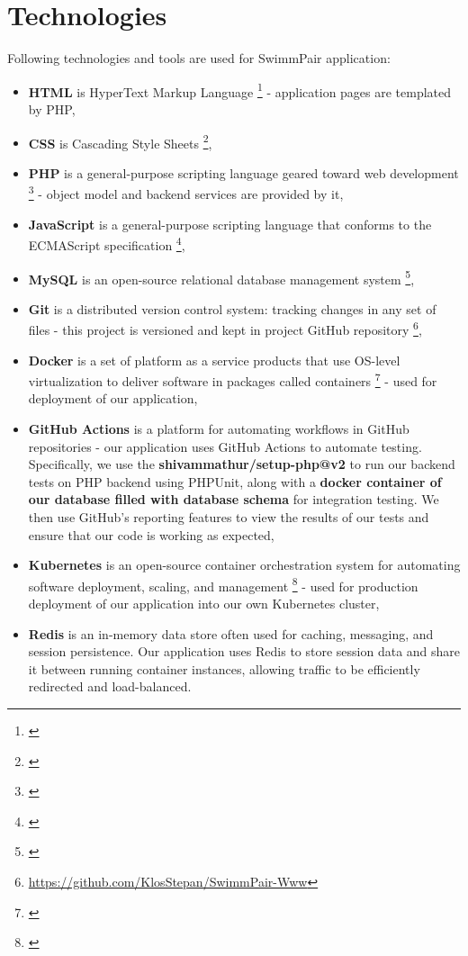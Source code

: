 \section{Technologies}
Following technologies and tools are used for SwimmPair application:
\begin{itemize}
    \item \textbf{HTML} is HyperText Markup Language \footnote{\citep{HTML5Standard}} - application pages are templated by PHP,
    \item \textbf{CSS} is Cascading Style Sheets \footnote{\citep{CSS3Standard}},
    \item \textbf{PHP} is a general-purpose scripting language geared toward web development \footnote{\citep{PHP74Standard}} - object model and backend services are provided by it,
    \item \textbf{JavaScript}  is a general-purpose scripting language that conforms to the ECMAScript specification \footnote{\citep{ECMADocu}},
    \item \textbf{MySQL} is an open-source relational database management system \footnote{\citep{MySQLDocu}},
    \item \textbf{Git} is a distributed version control system: tracking changes in any set of files - this project is versioned and kept in project GitHub repository \footnote{\url{https://github.com/KlosStepan/SwimmPair-Www}},
    \item \textbf{Docker} is a set of platform as a service products that use OS-level virtualization to deliver software in packages called containers \footnote{\citep{DockerDocu}} - used for deployment of our application,
    \item \textbf{GitHub Actions} is a platform for automating workflows in GitHub repositories - our application uses GitHub Actions to automate testing. Specifically, we use the \textbf{shivammathur/setup-php@v2} to run our backend tests on PHP backend using PHPUnit, along with a \textbf{docker container of our database filled with database schema} for integration testing. We then use GitHub's reporting features to view the results of our tests and ensure that our code is working as expected,
    \item \textbf{Kubernetes} is an open-source container orchestration system for automating software deployment, scaling, and management \footnote{\citep{K8sDocu}} - used for production deployment of our application into our own Kubernetes cluster,
    \item \textbf{Redis} is an in-memory data store often used for caching, messaging, and session persistence. Our application uses Redis to store session data and share it between running container instances, allowing traffic to be efficiently redirected and load-balanced.
\end{itemize} 
\newpage
